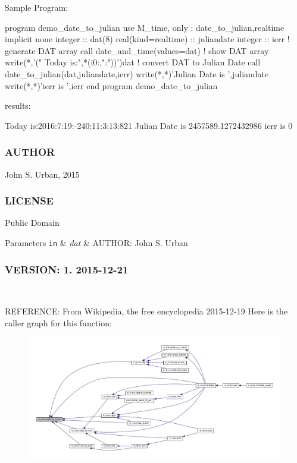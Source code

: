 \begin{DoxyVerb}Sample Program:

 program demo_date_to_julian
 use M_time, only : date_to_julian,realtime
 implicit none
 integer             :: dat(8)
 real(kind=realtime) :: juliandate
 integer             :: ierr
    ! generate DAT array
    call date_and_time(values=dat)
    ! show DAT array
    write(*,'(" Today is:",*(i0:,":"))')dat
    ! convert DAT to Julian Date
    call date_to_julian(dat,juliandate,ierr)
    write(*,*)'Julian Date is ',juliandate
    write(*,*)'ierr is ',ierr
 end program demo_date_to_julian

results:

 Today is:2016:7:19:-240:11:3:13:821
 Julian Date is    2457589.1272432986
 ierr is            0
\end{DoxyVerb}


\subsubsection*{A\+U\+T\+H\+OR}

John S. Urban, 2015 \subsubsection*{L\+I\+C\+E\+N\+SE}

Public Domain


\begin{DoxyParams}[1]{Parameters}
\mbox{\tt in}  & {\em dat} & A\+U\+T\+H\+OR\+: John S. Urban \subsubsection*{V\+E\+R\+S\+I\+ON\+: 1. 2015-\/12-\/21}\\
\hline
\end{DoxyParams}
R\+E\+F\+E\+R\+E\+N\+CE\+: From Wikipedia, the free encyclopedia 2015-\/12-\/19 Here is the caller graph for this function\+:\nopagebreak
\begin{figure}[H]
\begin{center}
\leavevmode
\includegraphics[width=350pt]{namespacem__time_acfdc970b4154b0c15bd33727636e3992_icgraph}
\end{center}
\end{figure}
\mbox{\label{namespacem__time_aed245c691853279ebf0ce899dec9caa9}} 

